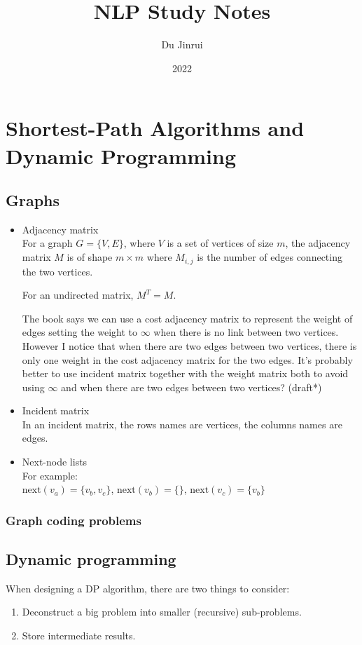 \documentclass{report}
\title{NLP Study Notes}
\author{Du Jinrui}
\date{2022} \usepackage[b6paper, margin=0.5in]{geometry}
\begin{document}
  \maketitle
  \tableofcontents
  \chapter{Shortest-Path Algorithms and Dynamic Programming}
  \section{Graphs}
  \begin{itemize}
  	\item Adjacency matrix \\
		For a graph $G = \{V, E\}$, where $V$ is a set of vertices of size $m$, the adjacency matrix $M$ is of shape $m \times m$ where $M_{i,j}$ is the number of edges connecting the two vertices. 

		For an undirected matrix, $M^T = M$.

	The book says we can use a cost adjacency matrix to represent the weight of edges setting the weight to $\infty$ when there is no link between two vertices. However I notice that when there are two edges between two vertices, there is only one weight in the cost adjacency matrix for the two edges. It's probably better to use incident matrix together with the weight matrix both to avoid using $\infty$ and when there are two edges between two vertices? (draft*)
	\item Incident matrix \\
In an incident matrix, the rows names are vertices, the columns names are edges.
	\item Next-node lists \\ 
		For example:\\
		$\text{next}(v_a) = \{v_b, v_c\}$, $\text{next}(v_b) = \{\}$, $\text{next}(v_c) = \{v_b\}$
  \end{itemize}
  \subsection{Graph coding problems}
  \section{Dynamic programming}
  When designing a DP algorithm, there are two things to consider:
  \begin{enumerate}
  	\item Deconstruct a big problem into smaller (recursive) sub-problems.
	\item Store intermediate results.
  \end{enumerate}
\end{document}
